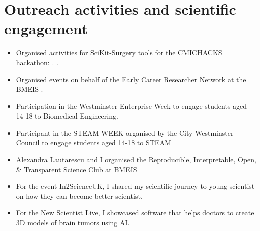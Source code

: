 \documentclass{mycv}
\begin{document}
\section{Outreach activities and scientific engagement}
\begin{itemize}
\item Organised activities for SciKit-Surgery tools for the CMICHACKS hackathon: \href{https://cmic-ucl.github.io/CMICHACKS//}{\faExternalLink*}. .
\item Organised events on behalf of the Early Career Researcher Network at the BMEIS .
\item Participation in the Westminster Enterprise Week to engage students aged 14-18 to Biomedical Engineering. 
\item Participant in the STEAM WEEK organised by the City Westminster Council to engage students aged 14-18 to STEAM \href{https://twitter.com/_mxochicale/status/1374407825607200769}{\faTwitter} 
\item Alexandra Lautarescu and I organised the Reproducible, Interpretable, Open, \& Transparent Science Club at BMEIS 
\item For the event In2ScienceUK, I shared my scientific journey to young scientist on how they can become better scientist.  
\item For the New Scientist Live, I showcased software that helps doctors to create 3D models of brain tumors using AI. 



\end{itemize}
\end{document}
